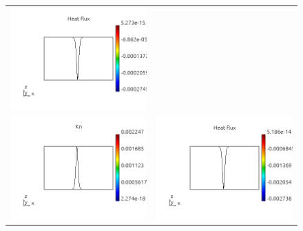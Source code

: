 \documentclass[review]{elsarticle}
\begin{document}
\begin{figure}[tbh]
\begin{center}
\begin{tabular}{cc}
      \includegraphics[width=\psize\textwidth]{figs/hflux_p41D1e5.png} \\
      \includegraphics[width=\psize\textwidth]{figs/Kn_p41D1e4.png} &
      \includegraphics[width=\psize\textwidth]{figs/hflux_p41D1e4.png} \\

\end{tabular}
\end{center}
\end{figure}
\end{document}
